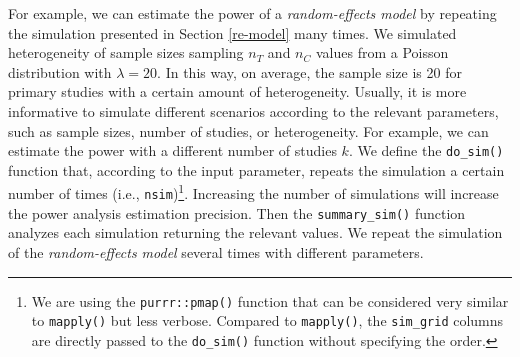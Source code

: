\documentclass[
  man,floatsintext]{apa6}
\begin{document}
For example, we can estimate the power of a \emph{random-effects model} by repeating the simulation presented in Section \ref{re-model} many times. We simulated heterogeneity of sample sizes sampling \(n_{T}\) and \(n_{C}\) values from a Poisson distribution with \(\lambda = 20\). In this way, on average, the sample size is 20 for primary studies with a certain amount of heterogeneity. Usually, it is more informative to simulate different scenarios according to the relevant parameters, such as sample sizes, number of studies, or heterogeneity. For example, we can estimate the power with a different number of studies \(k\). We define the \texttt{do\_sim()} function that, according to the input parameter, repeats the simulation a certain number of times (i.e., \texttt{nsim})\footnote{We are using the \texttt{purrr::pmap()} function that can be considered very similar to \texttt{mapply()} but less verbose. Compared to \texttt{mapply()}, the \texttt{sim\_grid} columns are directly passed to the \texttt{do\_sim()} function without specifying the order.}. Increasing the number of simulations will increase the power analysis estimation precision. Then the \texttt{summary\_sim()} function analyzes each simulation returning the relevant values. We repeat the simulation of the \emph{random-effects model} several times with different parameters.

\scriptsize
\end{document}
